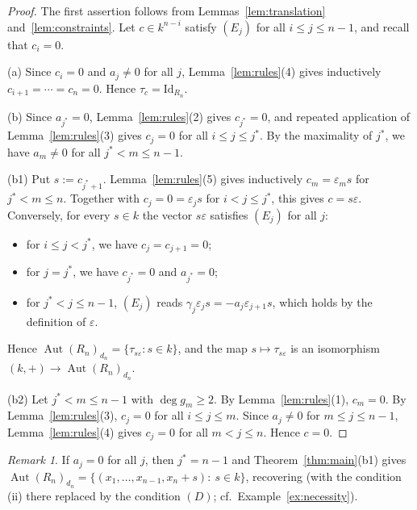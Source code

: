 \documentclass[11pt]{amsart}
\theoremstyle{definition}
\theoremstyle{remark}
\newtheorem{remark}[theorem]{Remark}
\numberwithin{equation}{theorem}
\newcommand{\Aut}{\operatorname{Aut}}
\newcommand{\id}{\mathrm{Id}}
\begin{document}
\begin{proof}
The first assertion follows from Lemmas~\ref{lem:translation} and~\ref{lem:constraints}. Let
$c\in k^{n-i}$ satisfy $(E_j)$ for all $i\le j\le n-1$, and recall that $c_i=0$.

(a) Since $c_i=0$ and $a_j\neq0$ for all $j$, Lemma~\ref{lem:rules}(4) gives inductively
$c_{i+1}=\cdots=c_n=0$. Hence $\tau_c=\id_{R_n}$.

(b) Since $a_{j^*}=0$, Lemma~\ref{lem:rules}(2) gives $c_{j^*}=0$, and repeated application of
Lemma~\ref{lem:rules}(3) gives $c_j=0$ for all $i\le j\le j^*$. By the maximality of $j^*$, we have
$a_m\neq0$ for all $j^*<m\le n-1$.

(b1) Put $s:=c_{j^*+1}$. Lemma~\ref{lem:rules}(5) gives inductively $c_m=\varepsilon_ms$ for
$j^*<m\le n$. Together with $c_j=0=\varepsilon_js$ for $i<j\le j^*$, this gives $c=s\varepsilon$.
Conversely, for every $s\in k$ the vector $s\varepsilon$ satisfies $(E_j)$ for all $j$:
\begin{itemize}
\item for $i\le j<j^*$, we have $c_j=c_{j+1}=0$;
\item for $j=j^*$, we have $c_{j^*}=0$ and $a_{j^*}=0$;
\item for $j^*<j\le n-1$, $(E_j)$ reads $\gamma_j\varepsilon_js=-a_j\varepsilon_{j+1}s$, which holds by
the definition of $\varepsilon$.
\end{itemize}
Hence $\Aut(R_n)_{d_n}=\{\tau_{s\varepsilon}:s\in k\}$, %
and the map
$s\mapsto\tau_{s\varepsilon}$ is an isomorphism $(k,+)\to\Aut(R_n)_{d_n}$.

(b2) Let $j^*<m\le n-1$ with $\deg g_m\ge2$. By Lemma~\ref{lem:rules}(1), $c_m=0$. By
Lemma~\ref{lem:rules}(3), $c_j=0$ for all $i\le j\le m$. Since $a_j\neq0$ for $m\le j\le n-1$,
Lemma~\ref{lem:rules}(4) gives $c_j=0$ for all $m<j\le n$. Hence $c=0$.
\end{proof}

\begin{remark}\label{rem:special} If $a_j=0$ for all $j$, then $j^*=n-1$ and Theorem~\ref{thm:main}(b1) gives
$\Aut(R_n)_{d_n}=\{(x_1,\dots,x_{n-1},x_n+s):\ s\in k\}$, recovering \cite[Theorem~2.4]{MMS25}
(with the condition (ii) there replaced by the condition $(D)$; cf.\ Example~\ref{ex:necessity}).
\end{remark}
\end{document}
